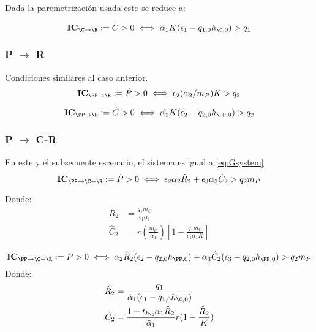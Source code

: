 Dada la paremetrizaci\'on usada esto se reduce a:

\begin{equation} \mathbf{IC_{\C \to \R}} := \dot{C} > 0 \iff \hat{\alpha_{1}} K (\epsilon_1 -q_{1,0} h_{\C,0}) > q_1 \end{equation}

\subsubsection{P $\to$ R}
Condiciones similares al caso anterior.
\begin{equation} \mathbf{IC_{\PP \to \R}} := \dot{P}>0 \iff \epsilon_2(\alpha_2/m_P) K > q_2 \end{equation}
            
\label{r-m-model}

\begin{equation} \mathbf{IC_{\PP \to \R}} := \dot{C} > 0 \iff \hat{\alpha_{2}} K (\epsilon_2 -q_{2,0}h_{\PP,0}) > q_2 \end{equation}

\subsubsection{P $\to$ C-R}
En este y el subsecuente escenario, el sistema es igual a \eqref{eq:Gsystem}
\begin{equation} \mathbf{IC_{\PP \to \C-\R}} := \dot{P} >0 \iff \epsilon_2\alpha_2\hat{R}_2 + \epsilon_3\alpha_3\hat{C}_2 > q_2 m_P \end{equation}

Donde:
\begin{equation}
\begin{aligned}
\hat{R}_2 &= \frac{q_1 m_C}{\epsilon_1 \alpha_1} \\
\hat{C}_2 &=  r(\frac{m_C}{\alpha_1}) \left[ 1 - \frac{q_1 m_C}{\epsilon_1 \alpha_1 K} \right] 
\end{aligned}
\end{equation}

\begin{equation} \mathbf{IC_{\PP \to \C-\R}} := \dot{P}> 0 \iff \alpha_2\hat{R}_2(\epsilon_2 - q_{2,0}h_{\PP,0}) + \alpha_3\hat{C}_2(\epsilon_3 -q_{2,0}h_{\PP,0})  > q_2 m_P \end{equation}
Donde:
\begin{equation}
\begin{aligned}
\hat{R}_2 & = \frac{q_1}{\hat{\alpha}_1 ( \epsilon_1 - q_{1,0}h_{\C,0})} \\
\hat{C}_2 & = \frac{1+ t_{h_\C} \alpha_1 \hat{R}_2 }{\hat{\alpha}_1} r(1-\frac{\hat{R}_2}{K}) 
\end{aligned}
\end{equation}

